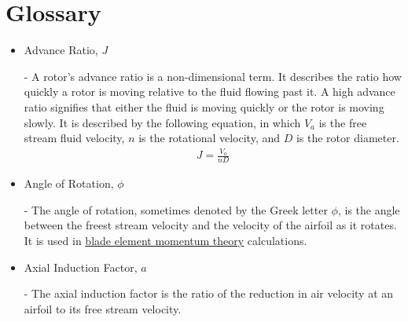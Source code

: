 \documentclass{article}
\begin{document}
\section{Glossary}
\begin{itemize}
	
	\item \hypertarget{J}{Advance Ratio, $J$} - A rotor's advance ratio is a non-dimensional term. It describes the ratio how quickly a rotor is moving relative to the fluid flowing past it. A high advance ratio signifies that either the fluid is moving quickly or the rotor is moving slowly. It is described by the following equation, in which $V_{a}$ is the free stream fluid velocity, $n$ is the rotational velocity, and $D$ is the rotor diameter.
	\begin{equation}
	\begin{aligned}
		J = \frac{V_{a}}{n D}
	\end{aligned}
	\end{equation}
	
	\item \hypertarget{phi}{Angle of Rotation, $\phi$} - The angle of rotation, sometimes denoted by the Greek letter $\phi$, is the angle between the freest stream velocity and the velocity of the airfoil as it rotates. It is used in \hyperlink{BEM}{blade element momentum theory} calculations.

	\item \hypertarget{a}{Axial Induction Factor, $a$} - The axial induction factor is the ratio of the reduction in air velocity at an airfoil to its free stream velocity.
	

\end{itemize}
\end{document}
